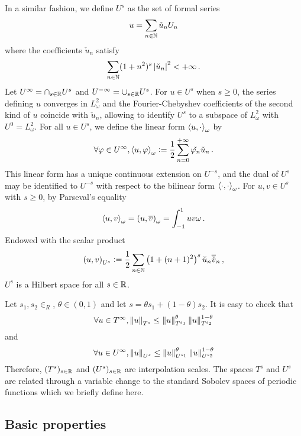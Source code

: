 \documentclass[a4paper]{article}
\begin{document}
\begin{Def}
	In a similar fashion, we define $U^{s}$ as the set of formal series 
	\[u = \sum_{n \in \mathbb{N}}\check{u}_n U_n\]
	where the coefficients $\check{u}_n$ satisfy
	\[\sum_{n \in \mathbb{N}} (1 + n^2)^s \left\lvert \check{u}_n \right\rvert^2 < + \infty\,.\]
	Let $U^\infty = \cap_{s \in \mathbb{R}} U^s$ and $U^{-\infty} = \cup_{s \in \mathbb{R}} U^s$. For $u \in U^s$ when $s \geq 0$, the series defining $u$ converges in $L^2_{\omega}$ and the Fourier-Chebyshev coefficients of the second kind of $u$ coincide with $\check{u}_n$, allowing to identify $U^s$ to a subspace of $L^2_{\omega}$ with $U^0 = L^2_\omega$. For all $u \in U^s$, we define the linear form $\left\langle u,\cdot\right\rangle_\omega$ by 
	\begin{equation}
		\label{dualiteUs}
		\forall \varphi \in U^\infty, \left\langle u,\varphi\right\rangle_\omega \mathrel{\mathop:}= \frac{1}{2} \sum_{n = 0}^{+ \infty} \check{\varphi_n}\check{u}_n\,.
	\end{equation}
	This linear form has a unique continuous extension on $U^{-s}$, and the dual of $U^s$ may be identified to $U^{-s}$ with respect to the bilinear form $\left\langle \cdot,\cdot\right\rangle_{\omega}$. For $u,v \in U^s$ with $s \geq 0$, by Parseval's equality 
	\[\left\langle u,v\right\rangle_\omega = \left( u,\overline v\right)_\omega = \int_{-1}^{1} uv \omega \,.\]
	Endowed with the scalar product
	\[\left( u,v\right)_{U^s} \mathrel{\mathop:}= \frac{1}{2}\sum_{n \in \mathbb{N}} \left(1 + (n + 1)^2\right)^s \check{u}_n \overline{\check{v}}_n\,,\] 
	$U^s$ is a Hilbert space for all $s \in \mathbb{R}$. 
\end{Def}
\noindent Let $s_1,s_2 \in _R$, $\theta \in (0,1)$ and let $s = \theta s_1 + (1-\theta)s_2$. It is easy to check that
\[\forall u \in T^\infty, \left\|u\right\|_{T^s} \leq \left\|u\right\|_{T^{s_1}}^\theta \left\|u\right\|_{T^{s_2}}^{1 - \theta}\]
and 
\[\forall u \in U^\infty, \left\|u\right\|_{U^s} \leq \left\|u\right\|_{U^{s_1}}^\theta \left\|u\right\|_{U^{s_2}}^{1 - \theta}\]
Therefore, $(T^s)_{s \in \mathbb{R}}$ and $(U^s)_{s \in \mathbb{R}}$ are interpolation scales. 
The spaces $T^s$ and $U^s$ are related through a variable change to the standard Sobolev spaces of periodic functions which we briefly define here. 

\subsection{Basic properties}
\end{document}
